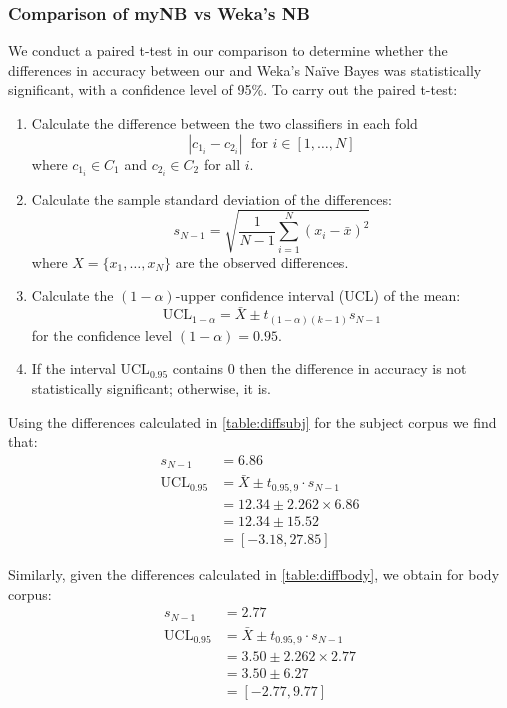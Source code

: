 \documentclass[10pt, a4paper]{article}
\begin{document}
\subsubsection{Comparison of myNB vs Weka's NB}

We conduct a paired t-test in our comparison to determine whether the differences in accuracy between our and Weka's Na\"ive Bayes was statistically significant, with a confidence level of 95\%. To carry out the paired t-test:

\begin{enumerate}
\item Calculate the difference between the two classifiers in each fold
$$ | c_{1_i} - c_{2_i} | \; \text{ for } i \in [1,\dots,N] $$
where $c_{1_i} \in C_1$ and $c_{2_i} \in C_2$ for all $i$.

\item Calculate the sample standard deviation of the differences:
$$ s_{N-1} = \sqrt{ \frac{1}{N-1} \sum_{i=1}^N (x_i-\bar{x})^2 } $$
where $X=\{ x_1,\dots,x_N \}$ are the observed differences.

\item Calculate the $(1-\alpha)$-upper confidence interval (UCL) of the mean:
$$ \text{UCL}_{1-\alpha} = \bar{X} \pm t_{(1-\alpha)(k-1)} s_{N-1} $$
for the confidence level $(1-\alpha)=0.95$.

\item If the interval $\text{UCL}_{0.95}$ contains 0 then the difference in accuracy is not statistically significant; otherwise, it is.
\end{enumerate}

Using the differences calculated in \autoref{table:diffsubj} for the subject corpus we find that:
\begin{align*}
s_{N-1} &= 6.86 \\
\text{UCL}_{0.95} &= \bar{X} \pm t_{0.95,9} \cdot s_{N-1} \\
  &= 12.34 \pm 2.262 \times 6.86 \\ 
  &= 12.34 \pm 15.52 \\
  &= [-3.18, 27.85]
\end{align*}

Similarly, given the differences calculated in \autoref{table:diffbody}, we obtain for body corpus:
\begin{align*}
s_{N-1} &= 2.77 \\
\text{UCL}_{0.95} &= \bar{X} \pm t_{0.95,9} \cdot s_{N-1} \\
  &= 3.50 \pm 2.262 \times 2.77 \\ 
  &= 3.50 \pm 6.27 \\
  &= [-2.77, 9.77]
\end{align*}
\end{document}
